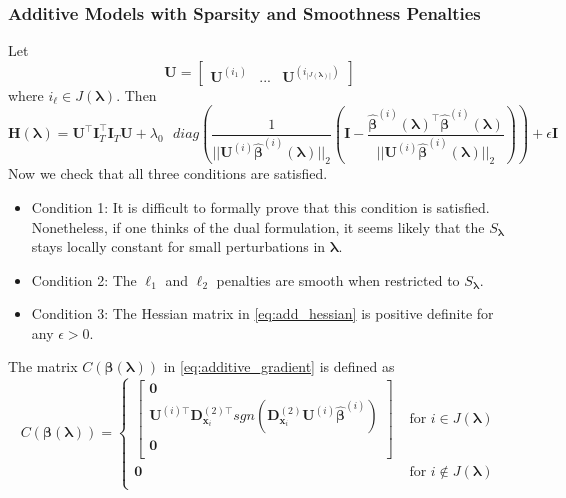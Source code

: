 \documentclass[12pt,letterpaper]{article}
\begin{document}
\subsubsection{Additive Models with Sparsity and Smoothness Penalties}
Let 
\begin{equation}
\boldsymbol{U} = \begin{bmatrix}
\boldsymbol {U}^{(i_1)} & ... & \boldsymbol {U}^{(i_{|J(\boldsymbol \lambda)|})}
\end{bmatrix}
\end{equation}
where $i_\ell \in J(\boldsymbol \lambda)$. Then
\begin{equation}
\boldsymbol{H}(\boldsymbol\lambda)
= \boldsymbol{U}^\top \boldsymbol I_T^\top \boldsymbol I_T \boldsymbol{U}
+ \lambda_0 \text{ } diag \left (
\frac{1}{||\boldsymbol {U}^{(i)}  \hat{\boldsymbol{\beta}}^{(i)} (\boldsymbol \lambda)||_2} \left (
\boldsymbol I - \frac{\hat{\boldsymbol{\beta}}^{(i)} (\boldsymbol \lambda)^\top \hat{\boldsymbol{\beta}}^{(i)} (\boldsymbol \lambda)}{||\boldsymbol {U}^{(i)}  \hat{\boldsymbol{\beta}}^{(i)} (\boldsymbol \lambda)||_2}
\right ) \right )
+ \epsilon \boldsymbol I
\label{eq:add_hessian}
\end{equation}
Now we check that all three conditions are satisfied.
\begin{itemize}
	\item[] Condition 1: It is difficult to formally prove that this condition is satisfied. Nonetheless, if one thinks of the dual formulation, it seems likely that the $S_{\boldsymbol{\lambda}}$ stays locally constant for small perturbations in $\boldsymbol{\lambda}$.
	\item[] Condition 2: The $\ell_1$ and $\ell_2$ penalties are smooth when restricted to $S_{\boldsymbol{\lambda}}$.\hfill {}
	\item[] Condition 3: The Hessian matrix in \eqref{eq:add_hessian} is positive definite for any $\epsilon > 0$. \hfill {}
\end{itemize}

The matrix $C(\boldsymbol \beta( \boldsymbol \lambda))$ in \eqref{eq:additive_gradient} is defined as
\begin{equation}
C(\boldsymbol \beta( \boldsymbol \lambda))
= \begin{cases}
\begin{bmatrix}
\boldsymbol{0} \\
\boldsymbol {U}^{(i)\top}  \boldsymbol{D}^{(2)\top}_{\boldsymbol{x}_i} 
sgn( \boldsymbol{D}^{(2)}_{\boldsymbol{x}_i} \boldsymbol {U}^{(i)} \hat{\boldsymbol{\beta}}^{(i)}) \\
\boldsymbol{0} \\
\end{bmatrix}
& \text{ for } i \in J(\boldsymbol \lambda) \\
\boldsymbol{0}
& \text{ for } i \not\in J(\boldsymbol \lambda) \\
\end{cases}
\end{equation}
\end{document}
